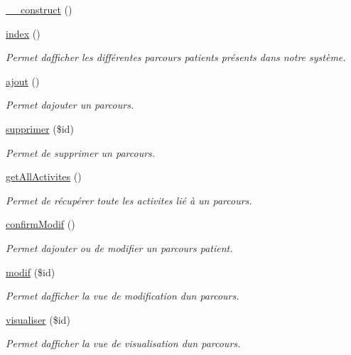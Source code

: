 \begin{DoxyCompactItemize}
\item 
\hyperlink{class_parcours_a77cd45a902eaaed1bef3cede1ce2e993}{\+\_\+\+\_\+construct} ()
\item 
\hyperlink{class_parcours_ae1473c8bcf0e0aaa4e9424aaf03d267f}{index} ()
\begin{DoxyCompactList}\small\item\em Permet d\textquotesingle{}afficher les différentes parcours patients présents dans notre système. \end{DoxyCompactList}\item 
\hyperlink{class_parcours_abc56a1fefadff06d25b1bdecfd07cf55}{ajout} ()
\begin{DoxyCompactList}\small\item\em Permet d\textquotesingle{}ajouter un parcours. \end{DoxyCompactList}\item 
\hyperlink{class_parcours_ade2bfb6cd293fac7431d3fabb1bb0496}{supprimer} (\$id)
\begin{DoxyCompactList}\small\item\em Permet de supprimer un parcours. \end{DoxyCompactList}\item 
\hyperlink{class_parcours_ab4aef9c3a8aed0c0dae3414bee68b48d}{get\+All\+Activites} ()
\begin{DoxyCompactList}\small\item\em Permet de récupérer toute les activites lié à un parcours. \end{DoxyCompactList}\item 
\hyperlink{class_parcours_a49d883ceb6b7abd49b5c3d97dac573cb}{confirm\+Modif} ()
\begin{DoxyCompactList}\small\item\em Permet d\textquotesingle{}ajouter ou de modifier un parcours patient. \end{DoxyCompactList}\item 
\hyperlink{class_parcours_aeb3dde633ec9f36be95da75fedf067f3}{modif} (\$id)
\begin{DoxyCompactList}\small\item\em Permet d\textquotesingle{}afficher la vue de modification d\textquotesingle{}un parcours. \end{DoxyCompactList}\item 
\hyperlink{class_parcours_ae7f7d51047a8f50bd396a6f345e4058f}{visualiser} (\$id)
\begin{DoxyCompactList}\small\item\em Permet d\textquotesingle{}afficher la vue de visualisation d\textquotesingle{}un parcours. \end{DoxyCompactList}\end{DoxyCompactItemize}


